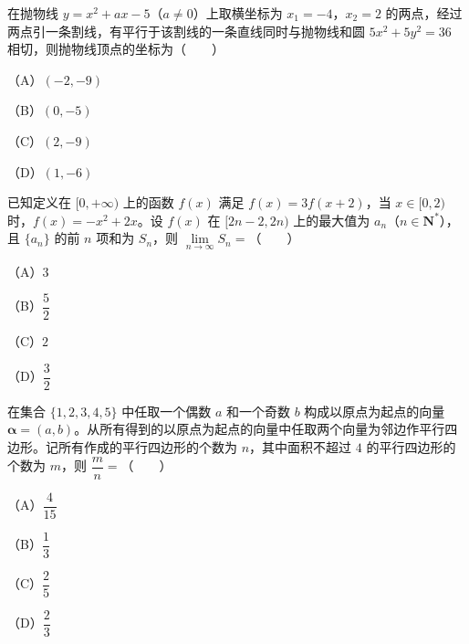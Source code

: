 \begin{question}
在抛物线 $y=x^2+ax-5$（$a\neq0$）上取横坐标为 $x_1=-4$，$x_2=2$ 的两点，经过两点引一条割线，有平行于该割线的一条直线同时与抛物线和圆 $5x^2+5y^2=36$ 相切，则抛物线顶点的坐标为\mbox{（　　）}

（A）$(-2,-9)$

（B）$(0,-5)$

（C）$(2,-9)$

（D）$(1,-6)$

\end{question}
\begin{question}
已知定义在 $[0,+\infty)$ 上的函数 $f(x)$ 满足 $f(x)=3f(x+2)$，当 $x\in[0,2)$ 时，$f(x)=-x^2+2x$。设 $f(x)$ 在 $[2n-2,2n)$ 上的最大值为 $a_n$（$n\in\mathbf N^*$），且 $\{a_n\}$ 的前 $n$ 项和为 $S_n$，则 $\lim\limits_{n\to\infty}S_n=$\mbox{（　　）}

（A）$3$

（B）$\dfrac52$

（C）$2$

（D）$\dfrac32$

\end{question}
\begin{question}
在集合 $\{1,2,3,4,5\}$ 中任取一个偶数 $a$ 和一个奇数 $b$ 构成以原点为起点的向量 $\boldsymbol\alpha=(a,b)$。从所有得到的以原点为起点的向量中任取两个向量为邻边作平行四边形。记所有作成的平行四边形的个数为 $n$，其中面积不超过 $4$ 的平行四边形的个数为 $m$，则 $\dfrac{m}{n}=$\mbox{（　　）}

（A）$\dfrac{4}{15}$

（B）$\dfrac13$

（C）$\dfrac25$

（D）$\dfrac23$

\end{question}

